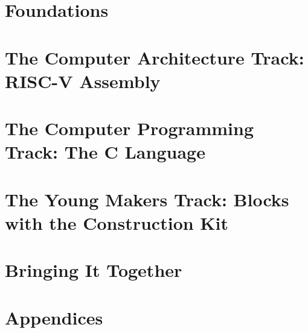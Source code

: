 \documentclass[11pt,twoside,openright]{book}
\begin{document}
\frontmatter


\tableofcontents



\mainmatter

\part{Foundations}





\part{The Computer Architecture Track: RISC-V Assembly}





\part{The Computer Programming Track: The C Language}




\part{The Young Makers Track: Blocks with the Construction Kit}





\part{Bringing It Together}



\appendix
\part{Appendices}






\backmatter

\end{document}
